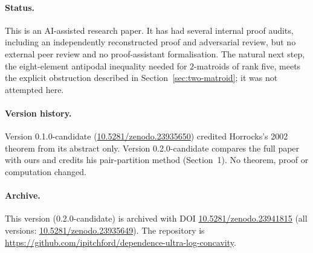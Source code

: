 \documentclass[11pt,a4paper]{article}
\theoremstyle{remark}
\begin{document}
\paragraph{Status.} This is an AI-assisted research paper. It has had several internal proof audits, including an independently reconstructed proof and adversarial review, but no external peer review and no proof-assistant formalisation. The natural next step, the eight-element antipodal inequality needed for $2$-matroids of rank five, meets the explicit obstruction described in Section~\ref{sec:two-matroid}; it was not attempted here.

\paragraph{Version history.} Version 0.1.0-candidate (\href{https://doi.org/10.5281/zenodo.23935650}{10.5281/zenodo.23935650}) credited Horrocks's 2002 theorem from its abstract only. Version 0.2.0-candidate compares the full paper with ours and credits his pair-partition method (Section~1). No theorem, proof or computation changed.

\paragraph{Archive.} This version (0.2.0-candidate) is archived with DOI \href{https://doi.org/10.5281/zenodo.23941815}{10.5281/zenodo.23941815} (all versions: \href{https://doi.org/10.5281/zenodo.23935649}{10.5281/zenodo.23935649}). The repository is \url{https://github.com/ipitchford/dependence-ultra-log-concavity}.
\end{document}
